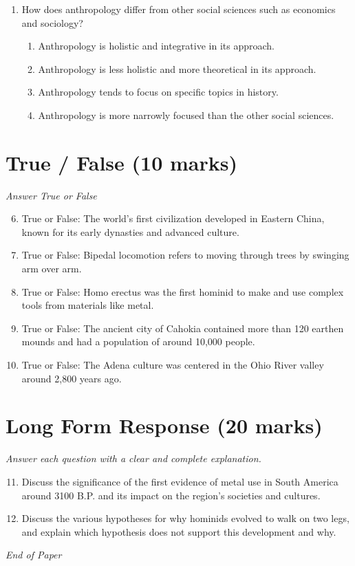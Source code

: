 \documentclass[12pt]{article}
\begin{document}
\begin{enumerate}[label=\arabic*.]
\begin{enumerate}[label=(\alph*)]
    \item all of the above
\end{enumerate}
\item How does anthropology differ from other social sciences such as economics and sociology?
\begin{enumerate}[label=(\alph*)]
    \item Anthropology is holistic and integrative in its approach.
    \item Anthropology is less holistic and more theoretical in its approach.
    \item Anthropology tends to focus on specific topics in history.
    \item Anthropology is more narrowly focused than the other social sciences.
\end{enumerate}
\end{enumerate}

\section*{True / False (10 marks)}
\textit{Answer True or False}
\begin{enumerate}[label=\arabic*.]
\setcounter{enumi}{5}
\item True or False: The world's first civilization developed in Eastern China, known for its early dynasties and advanced culture.
\item True or False: Bipedal locomotion refers to moving through trees by swinging arm over arm.
\item True or False: Homo erectus was the first hominid to make and use complex tools from materials like metal.
\item True or False: The ancient city of Cahokia contained more than 120 earthen mounds and had a population of around 10,000 people.
\item True or False: The Adena culture was centered in the Ohio River valley around 2,800 years ago.
\end{enumerate}

\section*{Long Form Response (20 marks)}
\textit{Answer each question with a clear and complete explanation.}
\begin{enumerate}[label=\arabic*.]
\setcounter{enumi}{10}
\item Discuss the significance of the first evidence of metal use in South America around 3100 B.P. and its impact on the region's societies and cultures.
\item Discuss the various hypotheses for why hominids evolved to walk on two legs, and explain which hypothesis does not support this development and why.
\end{enumerate}

\vfill
\noindent\textit{End of Paper}
\end{document}
